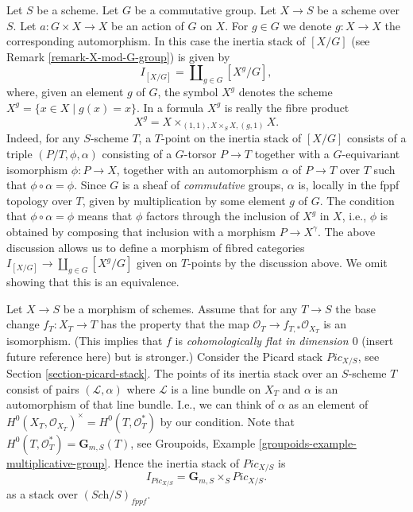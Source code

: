 \begin{example}
\label{example-inertia-stack-of-X-mod-G}
Let $S$ be a scheme. Let $G$ be a commutative group.
Let $X \to S$ be a scheme over $S$.
Let $a : G \times X \to X$ be an action of $G$ on $X$.
For $g \in G$ we denote $g : X \to X$ the corresponding automorphism.
In this case the inertia stack of $[X/G]$ (see
Remark \ref{remark-X-mod-G-group})
is given by
$$	
I_{[X/G]} = \coprod\nolimits_{g\in G} [X^g/G],
$$	
where, given an element $g$ of $G$, the symbol $X^g$ denotes the
scheme $X^g = \{x \in X \mid g(x) = x\}$. In a formula
$X^g$ is really the fibre
product
$$
X^g =  X \times_{(1, 1), X \times_S X, (g, 1)} X.
$$ 
Indeed, for any $S$-scheme $T$, a
$T$-point on the inertia stack of $[X/G]$ consists of a
triple $(P/T, \phi, \alpha)$ consisting of a $G$-torsor
$P\to T$ together with a $G$-equivariant isomorphism
$\phi : P \to X$, together
with an automorphism $\alpha$ of $P\to T$ over $T$ such that
$\phi \circ \alpha = \phi$.
Since $G$ is a sheaf of \emph{commutative} groups,
$\alpha$ is, locally in the fppf topology over $T$,
given by multiplication by some element $g$ of $G$.
The condition that $\phi \circ \alpha = \phi$ means that $\phi$
factors through the inclusion of $X^g$
in $X$, i.e., $\phi$ is obtained by composing that inclusion with a
morphism $P \to X^\gamma$.
The above discussion allows us to define a morphism of fibred categories
$I_{[X/G]} \to \coprod_{g\in G} [X^g/G]$ given on $T$-points by the discussion
above. We omit showing that this is an equivalence.
\end{example}

\begin{example}
\label{example-inertia-stack-of-picard}
Let $X\to S$ be a morphism of schemes.
Assume that for any $T \to S$ the base change $f_T : X_T \to T$
has the property that the map $\mathcal{O}_T \to f_{T, *}\mathcal{O}_{X_T}$
is an isomorphism. (This implies that $f$ is
{\it cohomologically flat in dimension $0$} (insert future reference here)
but is stronger.) Consider the Picard stack $\textit{Pic}_{X/S}$, see
Section \ref{section-picard-stack}.
The points of its inertia stack over an
$S$-scheme $T$ consist of pairs $(\mathcal{L}, \alpha)$
where $\mathcal{L}$ is a line bundle
on $X_T$ and $\alpha$ is an automorphism of that line bundle.
I.e., we can think of $\alpha$ as an element of
$H^0(X_T, \mathcal{O}_{X_T})^\times = H^0(T, \mathcal{O}_T^*)$
by our condition. Note that $H^0(T,\mathcal{O}_T^*) = \mathbf{G}_{m,S}(T)$,
see Groupoids, Example \ref{groupoids-example-multiplicative-group}.
Hence the inertia stack of $\textit{Pic}_{X/S}$ is
$$
I_{\textit{Pic}_{X/S}} = \mathbf{G}_{m,S} \times_S \textit{Pic}_{X/S}.
$$
as a stack over $(\textit{Sch}/S)_{fppf}$.
\end{example}























